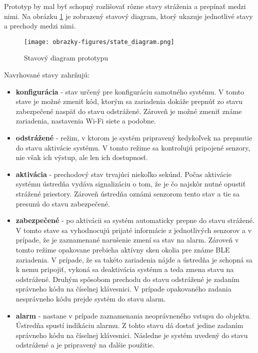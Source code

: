 Prototyp by mal byť schopný rozlišovať rôzne stavy stráženia a prepínať medzi nimi. Na obrázku \ref{fig:state_diagram} je zobrazený stavový diagram, ktorý ukazuje jednotlivé stavy a prechody medzi nimi.

\begin{figure}[ht]
    \centering
    \texttt{[image: obrazky-figures/state\_diagram.png]}
    \caption{Stavový diagram prototypu}
    \label{fig:state_diagram}
\end{figure}

Navrhované stavy zahrňujú:

\begin{itemize}
    \item \textbf{konfigurácia} - stav určený pre konfiguráciu samotného systému. V tomto stave je možné zmeniť kód, ktorým sa zariadenia dokáže prepnúť zo stavu zabezpečené naspäť do stavu odstrážené. Zároveň je možné zmeniť známe zariadenia, nastavenia Wi-Fi siete a podobne. 
    \item \textbf{odstrážené} - režim, v ktorom je systém pripravený kedykoľvek na prepnutie do stavu aktivácie systému. V tomto režime sa kontrolujú pripojené senzory, nie však ich výstup, ale len ich dostupnosť.
    \item \textbf{aktivácia} - prechodový stav trvajúci niekoľko sekúnd. Počas aktivácie systému ústredňa vydáva signalizáciu o tom, že je čo najskôr nutné opustiť strážené priestory. Zároveň ústredňa oznámi senzorom tento stav a tie sa presunú do stavu zabezpečené.
    \item \textbf{zabezpečené} - po aktivácii sa systém automaticky prepne do stavu strážené. V tomto stave sa vyhodnocujú prijaté informácie z jednotlivých senzorov a v prípade, že je zaznamenané narušenie zmení sa stav na alarm. Zároveň v tomto režime opakovane prebieha aktívny sken okolia pre známe BLE zariadenia. V prípade, že sa takéto zariadenia nájde a ústredňa je schopná sa k nemu pripojiť, vykoná sa deaktivácia systému a teda zmena stavu na odstrážené. Druhým spôsobom prechodu do stavu odstrážené je zadaním správneho kódu na číselnej klávesnici. V prípade opakovaného zadania nesprávneho kódu prejde systém do stavu alarm.
    \item \textbf{alarm} - nastane v prípade zaznamenania neoprávneného vstupu do objektu. Ústredňa spustí indikáciu alarmu. Z tohto stavu dá dostať jedine zadaním správneho kódu na číselnej klávesnici. Následne je systém uvedený do stavu odstrážené a je pripravený na ďalšie použitie.
\end{itemize}

